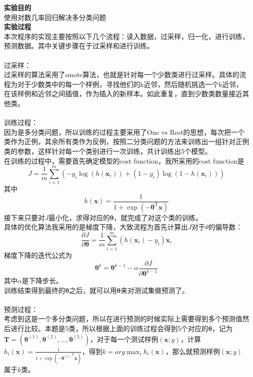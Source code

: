 \documentclass[a4paper,UTF8]{article}
\numberwithin{equation}{section}
\begin{document}
\noindent\textbf{实验目的}\\
使用对数几率回归解决多分类问题\\

\noindent\textbf{实验过程}\\
本次程序的实现主要按照以下几个流程：读入数据，过采样，归一化，进行训练，预测数据。其中关键步骤在于过采样和进行训练。\\\\
过采样：\\
过采样的算法采用了smote算法，也就是针对每一个少数类进行过采样。具体的流程为对于少数类中的每一个样例，寻找他们的k近邻，然后随机挑选一个k近邻，在该样例和近邻之间插值，作为插入的新样本。如此重复，直到少数类数量接近其他类。\\\\
训练过程：\\
因为是多分类问题，所以训练的过程主要采用了One vs Rest的思想，每次把一个类作为正例，其余所有类作为反例，按照二分类问题的方法来训练出一组针对正例类的参数，这样针对每一个类别进行一次训练，共计训练出5个模型。\\
在训练的过程中，需要首先确定模型的cost function，我所采用的cost function是
\begin{equation}
J = \frac{1}{m}\sum_{i=1}^{m}(-y_i\log(h(\mathbf{x}_i)) + (1-y_i)\log(1-h(\mathbf{x}_i)))
\end{equation}
其中
\begin{equation}
h(\mathbf{x}) = \frac{1}{1 + \exp(-\boldsymbol{\theta}^\mathrm{T}\mathbf{x})}
\end{equation}
接下来只要对$J$最小化，求得对应的$\boldsymbol{\theta}$，就完成了对这个类的训练。\\
具体的优化算法我采用的是梯度下降，大致流程为首先计算出$J$对于$\theta$的偏导数：
\begin{equation}
\frac{\partial J}{\partial \boldsymbol{\theta}} = \frac{1}{m}\sum_{i=1}^{m}(h(\mathbf{x}_i )- y_i)\mathbf{x}_i
\end{equation}
梯度下降的迭代公式为
\begin{equation}
\boldsymbol{\theta}^k = \boldsymbol{\theta}^{k-1} - \alpha\frac{\partial J}{\partial \boldsymbol{\theta}^{k-1}}
\end{equation}
其中$\alpha$是下降步长。\\
训练结束得到最终的$\boldsymbol{\theta}$之后，就可以用$\boldsymbol{\theta}$来对测试集做预测了。\\\\
预测过程：\\
考虑到这是一个多分类问题，所以在进行预测的时候实际上需要得到多个预测值然后进行比较。本题是5类，所以根据上面的训练过程会得到5个对应的$\boldsymbol{\theta}$，记为$\mathbf{T} = (\boldsymbol{\theta}^{(1)}, \boldsymbol{\theta}^{(2)}, ..., \boldsymbol{\theta}^{(5)})$，对于每一个测试样例$(\mathbf{x}; y)$，计算$h_i(\mathbf{x}) = \frac{1}{1 + \exp(-{\boldsymbol{\theta}^{(i)}}^\mathrm{T}\mathbf{x})}$，得到$k=arg \max_i h_i(\mathbf{x})$，那么就预测样例$(\mathbf{x}; y)$属于$k$类。\\\\
\end{document}
